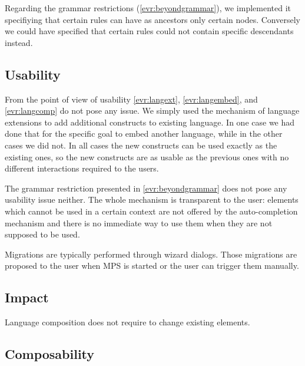 \documentclass[preprint,numbers,10pt]{sigplanconf}
\begin{document}
Regarding the grammar restrictions (\ref{evr:beyondgrammar}), we implemented it specifiying that certain rules can have as ancestors only certain nodes. Conversely we could have specified that certain rules could not contain specific descendants instead.

\subsection{Usability}

From the point of view of usability \ref{evr:langext}, \ref{evr:langembed}, and \ref{evr:langcomp} do not pose any issue. We simply used the mechanism of language extensions to add additional constructs to existing language. In one case we had done that for the specific goal to embed another language, while in the other cases we did not. In all cases the new constructs can be used exactly as the existing ones, so the new constructs are as usable as the previous ones with no different interactions required to the users.

The grammar restriction presented in \ref{evr:beyondgrammar} does not pose any usability issue neither. The whole mechanism is transparent to the user: elements which cannot be used in a certain context are not offered by the auto-completion mechanism and there is no immediate way to use them when they are not supposed to be used.

Migrations are typically performed through wizard dialogs. Those migrations are proposed to the user when MPS is started or the user can trigger them manually.

\subsection{Impact}

Language composition does not require to change existing elements.

\subsection{Composability}
\end{document}
